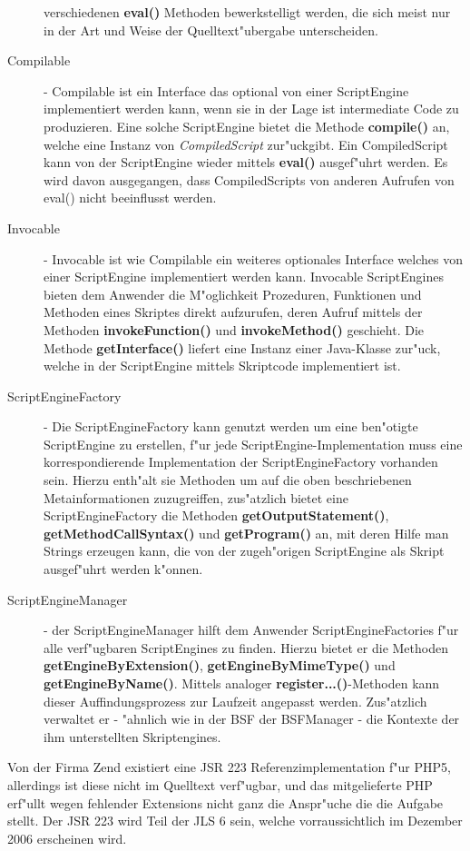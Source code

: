 \begin{description}
    verschiedenen \textbf{eval()} Methoden bewerkstelligt werden, die sich meist nur in der Art und Weise der Quelltext"ubergabe
    unterscheiden.
    \item[Compilable] - Compilable ist ein Interface das optional von einer ScriptEngine implementiert werden kann, wenn sie in der Lage
    ist intermediate Code zu produzieren. Eine solche ScriptEngine bietet die Methode \textbf{compile()} an, welche eine Instanz
    von \emph{CompiledScript} zur"uckgibt. Ein CompiledScript kann von der ScriptEngine wieder mittels \textbf{eval()} ausgef"uhrt werden.
    Es wird davon ausgegangen, dass CompiledScripts von anderen Aufrufen von eval() nicht beeinflusst werden.
    \item[Invocable] - Invocable ist wie Compilable ein weiteres optionales Interface welches von einer ScriptEngine implementiert
    werden kann. Invocable ScriptEngines bieten dem Anwender die M"oglichkeit Prozeduren, Funktionen und Methoden eines Skriptes 
    direkt aufzurufen, deren Aufruf mittels der Methoden \textbf{invokeFunction()} und \textbf{invokeMethod()} geschieht.
    Die Methode \textbf{getInterface()} liefert eine Instanz einer Java-Klasse zur"uck, welche in der ScriptEngine mittels
    Skriptcode implementiert ist.
    \item[ScriptEngineFactory] - Die ScriptEngineFactory kann genutzt werden um eine ben"otigte ScriptEngine zu erstellen,
    f"ur jede ScriptEngine-Implementation muss eine korrespondierende Implementation der ScriptEngineFactory vorhanden sein.
    Hierzu enth"alt sie Methoden um auf die oben beschriebenen Metainformationen zuzugreiffen, zus"atzlich bietet eine ScriptEngineFactory
    die Methoden \textbf{getOutputStatement()}, \textbf{getMethodCallSyntax()} und \textbf{getProgram()} an, mit deren Hilfe
    man Strings erzeugen kann, die von der zugeh"origen ScriptEngine als Skript ausgef"uhrt werden k"onnen.
    \item[ScriptEngineManager] - der ScriptEngineManager hilft dem Anwender ScriptEngineFactories f"ur alle verf"ugbaren
    ScriptEngines zu finden. Hierzu bietet er die Methoden \textbf{getEngineByExtension()}, \textbf{getEngineByMimeType()} und
    \textbf{getEngineByName()}. Mittels analoger \textbf{register...()}-Methoden kann dieser Auffindungsprozess zur Laufzeit
    angepasst werden.
    Zus"atzlich verwaltet er - "ahnlich wie in der BSF der BSFManager - die Kontexte der ihm unterstellten Skriptengines.
\end{description}

Von der Firma Zend existiert eine JSR 223 Referenzimplementation f"ur PHP5, allerdings ist diese nicht im Quelltext verf"ugbar,
und das mitgelieferte PHP erf"ullt wegen fehlender Extensions nicht ganz die Anspr"uche die die Aufgabe stellt.
Der JSR 223 wird Teil der JLS 6 sein, welche vorraussichtlich im Dezember 2006 erscheinen wird.

